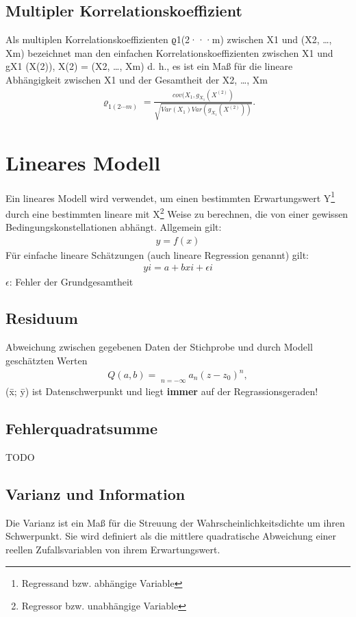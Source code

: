 \documentclass[a4paper,10pt]{scrartcl}
\begin{document}
\subsection{Multipler Korrelationskoeffizient}
Als multiplen Korrelationskoeffizienten ϱ1(2···m) zwischen X1 und (X2, …, Xm) bezeichnet man den einfachen Korrelationskoeffizienten zwischen X1 und gX1 (X(2)), X(2) = (X2, …, Xm) d. h., es ist ein Maß für die lineare Abhängigkeit zwischen X1 und der Gesamtheit der X2, …, Xm
\begin{eqnarray}{\varrho }_{1(\mathrm{2\cdots}m)}=\frac{{cov}({X}_{1},{g}_{{X}_{1}}({X}^{(2)})}{\sqrt{Var({X}_{1})Var({g}_{{X}_{1}}({X}^{(2)}))}}.\end{eqnarray}
\newpage
\section{Lineares Modell}
Ein lineares Modell wird verwendet, um einen bestimmten Erwartungswert Y\footnote{Regressand bzw. abhängige Variable} durch eine bestimmten lineare mit X\footnote{Regressor bzw. unabhängige Variable} Weise zu berechnen, die von einer gewissen Bedingungskonstellationen abhängt. Allgemein gilt:
\begin{eqnarray*}
y = f(x)
\end{eqnarray*}
Für einfache lineare Schätzungen (auch lineare Regression genannt) gilt:
\begin{eqnarray*}
yi = a + bxi + \epsilon i
\end{eqnarray*}
$\epsilon$: Fehler der Grundgesamtheit \newline

\subsection{Residuum}
Abweichung zwischen gegebenen Daten der Stichprobe und durch Modell geschätzten Werten
\begin{eqnarray*}Q(a,b)=\mathop{\sum ^{\infty }}\limits_{n=-\infty }{a}_{n}{(z-{z}_{0})}^{n},\end{eqnarray*}
(\={x}; \={y}) ist Datenschwerpunkt und liegt \textbf{immer} auf der Regrassionsgeraden!
\subsection{Fehlerquadratsumme}
TODO
\subsection{Varianz und Information}
Die Varianz ist ein Maß für die Streuung der Wahrscheinlichkeitsdichte um ihren Schwerpunkt. Sie wird definiert als die mittlere quadratische Abweichung einer reellen Zufallsvariablen von ihrem Erwartungswert.
\end{document}
